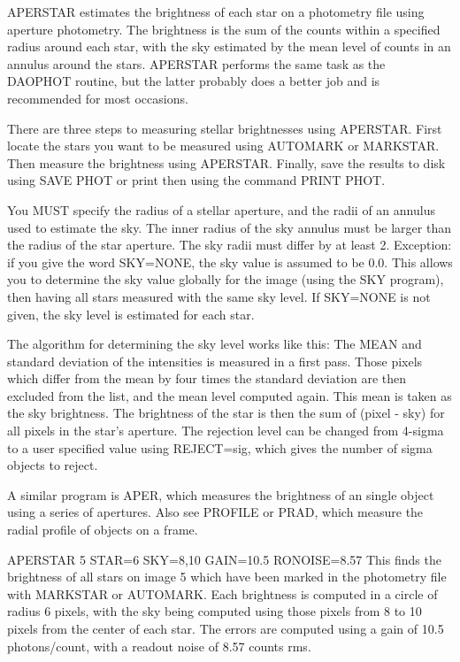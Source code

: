 APERSTAR estimates the brightness of each star on a photometry file using
aperture photometry.  The brightness is the sum of the counts within a
specified radius around each star, with the sky estimated by the mean level
of counts in an annulus around the stars. APERSTAR performs the same task
as the DAOPHOT 
 routine, 
but the latter probably does a better
job and is recommended for most occasions.

There are three steps to measuring stellar brightnesses using
APERSTAR. First locate the stars you want to be measured using AUTOMARK or
MARKSTAR.  Then measure the brightness using APERSTAR.  Finally, save the
results to disk using SAVE PHOT or print then using the command PRINT PHOT.

You MUST specify the radius of a stellar aperture, and the radii of an
annulus used to estimate the sky.  The inner radius of the sky annulus must
be larger than the radius of the star aperture. The sky radii must differ
by at least 2.  Exception: if you give the word SKY=NONE, the sky value is
assumed to be 0.0.  This allows you to determine the sky value globally for
the image (using the SKY program), then having all stars measured with the
same sky level. If SKY=NONE is not given, the sky level is estimated for
each star.

The algorithm for determining the sky level works like this: The MEAN and
standard deviation of the intensities is measured in a first pass. Those
pixels which differ from the mean by four times the standard deviation are
then excluded from the list, and the mean level computed again.  This mean
is taken as the sky brightness.  The brightness of the star is then the sum
of (pixel - sky) for all pixels in the star's aperture.  The rejection
level can be changed from 4-sigma to a user specified value using
REJECT=sig, which gives the number of sigma objects to reject.

A similar program is APER, which measures the brightness of an single
object using a series of apertures.  Also see PROFILE or PRAD, which
measure the radial profile of objects on a frame.

\begin{example}
  \item[APERSTAR 5 STAR=6 SKY=8,10 GAIN=10.5 RONOISE=8.57\hfill]{
This finds the brightness of all stars on image 5 which
have been marked in the photometry file with MARKSTAR 
or AUTOMARK.  Each brightness is computed in a circle of
radius 6 pixels, with the sky being computed using those
pixels from 8 to 10 pixels from the center of each star.
The errors are computed using a gain of 10.5 photons/count,
with a readout noise of 8.57 counts rms.}
\end{example}


